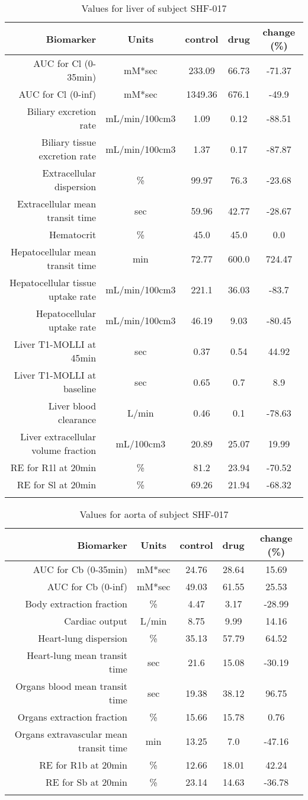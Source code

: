 \documentclass{epflreport}%
\begin{document}
%
\clearpage%
\begin{longtable}{rcccc}%
\hline%
Biomarker&Units&control&drug&change (\%)\\%
\hline%
AUC for Cl (0{-}35min)&mM*sec&233.09&66.73&{-}71.37\\%
AUC for Cl (0{-}inf)&mM*sec&1349.36&676.1&{-}49.9\\%
Biliary excretion rate&mL/min/100cm3&1.09&0.12&{-}88.51\\%
Biliary tissue excretion rate&mL/min/100cm3&1.37&0.17&{-}87.87\\%
Extracellular dispersion&\%&99.97&76.3&{-}23.68\\%
Extracellular mean transit time&sec&59.96&42.77&{-}28.67\\%
Hematocrit&\%&45.0&45.0&0.0\\%
Hepatocellular mean transit time&min&72.77&600.0&724.47\\%
Hepatocellular tissue uptake rate&mL/min/100cm3&221.1&36.03&{-}83.7\\%
Hepatocellular uptake rate&mL/min/100cm3&46.19&9.03&{-}80.45\\%
Liver T1{-}MOLLI at 45min&sec&0.37&0.54&44.92\\%
Liver T1{-}MOLLI at baseline&sec&0.65&0.7&8.9\\%
Liver blood clearance&L/min&0.46&0.1&{-}78.63\\%
Liver extracellular volume fraction&mL/100cm3&20.89&25.07&19.99\\%
RE for R1l at 20min&\%&81.2&23.94&{-}70.52\\%
RE for Sl at 20min&\%&69.26&21.94&{-}68.32\\%
\hline%
\caption{Values for liver of subject SHF-017} \\%
\end{longtable}%
\begin{longtable}{rcccc}%
\hline%
Biomarker&Units&control&drug&change (\%)\\%
\hline%
AUC for Cb (0{-}35min)&mM*sec&24.76&28.64&15.69\\%
AUC for Cb (0{-}inf)&mM*sec&49.03&61.55&25.53\\%
Body extraction fraction&\%&4.47&3.17&{-}28.99\\%
Cardiac output&L/min&8.75&9.99&14.16\\%
Heart{-}lung dispersion&\%&35.13&57.79&64.52\\%
Heart{-}lung mean transit time&sec&21.6&15.08&{-}30.19\\%
Organs blood mean transit time&sec&19.38&38.12&96.75\\%
Organs extraction fraction&\%&15.66&15.78&0.76\\%
Organs extravascular mean transit time&min&13.25&7.0&{-}47.16\\%
RE for R1b at 20min&\%&12.66&18.01&42.24\\%
RE for Sb at 20min&\%&23.14&14.63&{-}36.78\\%
\hline%
\caption{Values for aorta of subject SHF-017} \\%
\end{longtable}%
\clearpage%
\end{document}
